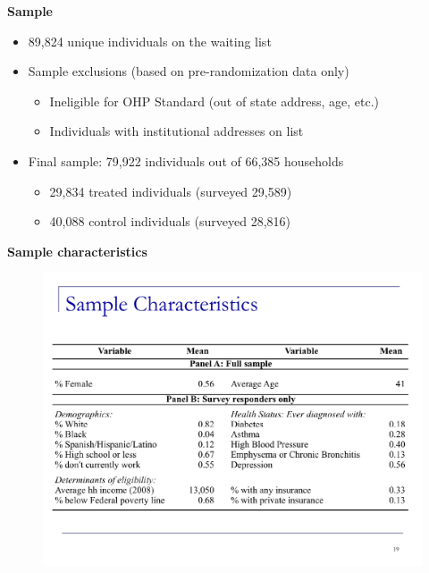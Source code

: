 \documentclass[notes=show]{beamer}
\begin{document}
\begin{frame}[plain]
	\begin{center}
	\textbf{Sample}
	\end{center}
	
	\begin{itemize}
	\item 89,824 unique individuals on the waiting list
	\item Sample exclusions (based on pre-randomization data only)
		\begin{itemize}
		\item Ineligible for OHP Standard (out of state address, age, etc.)
		\item Individuals with institutional addresses on list
		\end{itemize}
	\item Final sample: 79,922 individuals out of 66,385 households
		\begin{itemize}
		\item 29,834 treated individuals (surveyed 29,589)
		\item 40,088 control individuals (surveyed 28,816)
		\end{itemize}
	\end{itemize}
\end{frame}


\begin{frame}[plain]
	\begin{center}
	\textbf{Sample characteristics}
	\end{center}
	
	\begin{figure}
	\includegraphics[scale=0.40]{./lecture_includes/baicker_3.pdf}
	\end{figure}
\end{frame}
\end{document}
